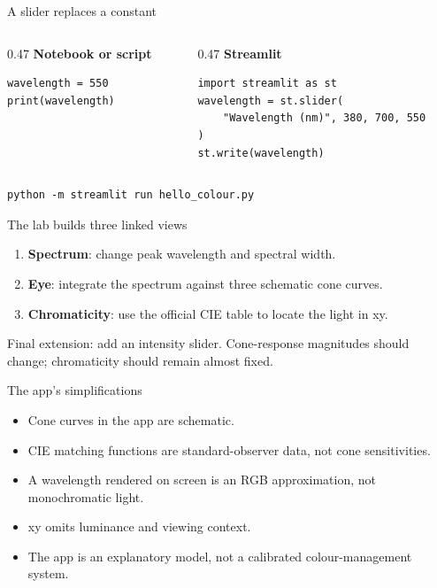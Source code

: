 \documentclass[aspectratio=169,11pt]{beamer}
\begin{document}
\begin{frame}[fragile]{A slider replaces a constant}
  \begin{columns}[T]
    \begin{column}{0.47\textwidth}
      \textbf{Notebook or script}
\begin{verbatim}
wavelength = 550
print(wavelength)
\end{verbatim}
    \end{column}
    \begin{column}{0.47\textwidth}
      \textbf{Streamlit}
\begin{verbatim}
import streamlit as st
wavelength = st.slider(
    "Wavelength (nm)", 380, 700, 550
)
st.write(wavelength)
\end{verbatim}
    \end{column}
  \end{columns}
  \vspace{0.7em}
\begin{verbatim}
python -m streamlit run hello_colour.py
\end{verbatim}
\end{frame}

\begin{frame}{The lab builds three linked views}
  \begin{enumerate}
    \item \textbf{Spectrum}: change peak wavelength and spectral width.
    \item \textbf{Eye}: integrate the spectrum against three schematic cone curves.
    \item \textbf{Chromaticity}: use the official CIE table to locate the light in xy.
  \end{enumerate}
  \vspace{0.8em}
  Final extension: add an intensity slider. Cone-response magnitudes should change; chromaticity should remain almost fixed.
\end{frame}

\begin{frame}{The app's simplifications}
  \begin{itemize}
    \item Cone curves in the app are schematic.
    \item CIE matching functions are standard-observer data, not cone sensitivities.
    \item A wavelength rendered on screen is an RGB approximation, not monochromatic light.
    \item xy omits luminance and viewing context.
    \item The app is an explanatory model, not a calibrated colour-management system.
  \end{itemize}
\end{frame}
\end{document}
